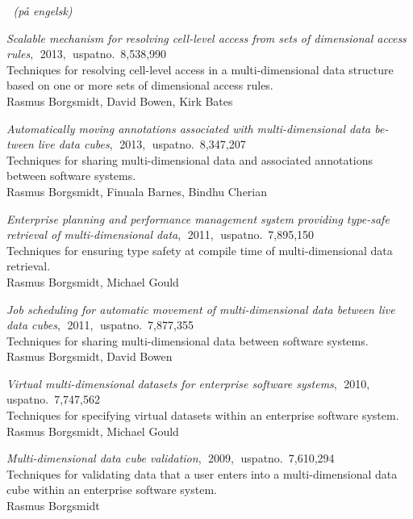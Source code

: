 \documentclass[a4paper,10pt,final]{memoir}
\DeclareRobustCommand{\spacedallcaps}[1]{\MakeTextUppercase{\allcapsspacing{#1}}}%
\newcommand{\Sep}{\vspace{1.5em}}
\newcommand{\SmallSep}{\vspace{0.5em}}
\newcommand{\MedSep}{\vspace{1em}}
\newcommand{\CVSectionEm}[2]
	{\textbf{\spacedallcaps{#1}}$\;$ {\em (#2)}\par
	\SmallSep\normalsize\normalfont}
\newcommand{\CVItem}[1]
	{\textit{\color{SpotColor} #1}}
\begin{document}
\Sep\CVSectionEm{patenter}{på engelsk}

\CVItem{Scalable mechanism for resolving cell-level access from sets of
  dimensional access rules},$\;$ 2013,$\;$ uspatno.~8,538,990\\[3pt]
Techniques for resolving cell-level access in a multi-dimensional data structure
based on one or more sets of dimensional access rules.\\[3pt]
Rasmus Borgsmidt, David Bowen, Kirk Bates

\MedSep\CVItem{Automatically moving annotations associated with
  multi-dimensional data be-\linebreak tween live data cubes},$\;$ 2013,$\;$
uspatno.~8,347,207\\[3pt]
Techniques for sharing multi-dimensional data and associated annotations between
software systems.\\[3pt]
Rasmus Borgsmidt, Finuala Barnes, Bindhu Cherian

\MedSep\CVItem{Enterprise planning and performance management system
  providing type-safe retrieval of multi-dimensional data},$\;$ 2011,$\;$
uspatno.~7,895,150\\[3pt]
Techniques for ensuring type safety at compile time of multi-dimensional data
retrieval.\\[3pt]
Rasmus Borgsmidt, Michael Gould

\MedSep\CVItem{Job scheduling for automatic movement of
  multi-dimensional data between live data cubes},$\;$ 2011,$\;$
uspatno.~7,877,355\\[3pt]
Techniques for sharing multi-dimensional data between software systems.\\[3pt]
Rasmus Borgsmidt, David Bowen

\MedSep\CVItem{Virtual multi-dimensional datasets for enterprise
  software systems},$\;$ 2010,\\
uspatno.~7,747,562\\[3pt]
Techniques for specifying virtual datasets within an enterprise
software system.\\[3pt]
Rasmus Borgsmidt, Michael Gould

\MedSep\CVItem{Multi-dimensional data cube validation},$\;$ 2009,$\;$
uspatno.~7,610,294\\[3pt]
Techniques for validating data that a user enters into a multi-dimensional data
cube within an enterprise software system.\\[3pt]
Rasmus Borgsmidt
\end{document}
